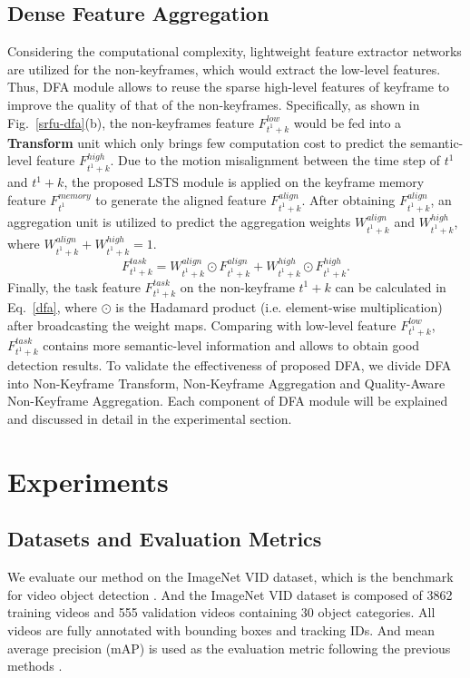 \documentclass[runningheads]{llncs}
\begin{document}
\subsection{Dense Feature Aggregation}\label{subsec:DFA}
Considering the computational complexity, lightweight feature extractor networks are utilized for the non-keyframes, which would extract the low-level features. 
Thus, DFA module allows to reuse the sparse high-level features of keyframe to improve the quality of that of the non-keyframes.
Specifically, as shown in Fig.~\ref{srfu-dfa}(b), the non-keyframes feature  $F_{t^1+k}^{low}$ would be fed into a \textbf{Transform} unit which only brings few computation cost to predict the semantic-level feature $F_{t^1+k}^{high}$.
Due to the motion misalignment between the time step of $t^1$ and $t^1+k$, the proposed LSTS module is applied on the keyframe memory feature $F_{t^1}^{memory}$ to generate the aligned feature $F_{t^1+k}^{align}$.
After obtaining $F_{t^1+k}^{align}$, an aggregation unit is utilized to predict the aggregation weights $W_{t^1+k}^{align}$ and $W_{t^1+k}^{high}$, where $W_{t^1+k}^{align} +W_{t^1+k}^{high} = 1$.
\begin{equation}
 F_{t^1+k}^{task} =  W_{t^1+k}^{align} \odot F_{t^1+k}^{align} + W_{t^1+k}^{high} \odot F_{t^1+k}^{high}.
 \label{dfa}
\end{equation}
Finally, the task feature $F_{t^1+k}^{task}$ on the non-keyframe $t^1+k$ can be calculated in Eq.~\ref{dfa}, where $\odot$ is the Hadamard product (i.e. element-wise multiplication) after broadcasting the weight maps. Comparing with low-level feature $F_{t^1+k}^{low}$, $F_{t^1+k}^{task}$ contains more semantic-level information and allows to obtain good detection results. To validate the effectiveness of proposed DFA, we divide DFA into Non-Keyframe Transform, Non-Keyframe Aggregation and Quality-Aware  Non-Keyframe  Aggregation. Each component of DFA module will be explained and discussed in detail in the experimental section.


\section{Experiments}
\subsection{Datasets and Evaluation Metrics}
We evaluate our method on the ImageNet VID dataset, which is the benchmark for video object detection \cite{russakovsky2015imagenet}. And the ImageNet VID dataset is composed of 3862 training videos and 555 validation videos containing 30 object categories. All videos are fully annotated with bounding boxes and tracking IDs. And mean average precision (mAP) is used as the evaluation metric following the previous methods \cite{zhu2017deep}.
\end{document}
